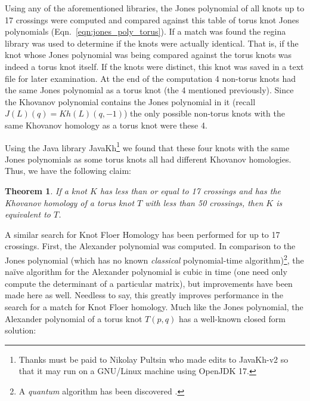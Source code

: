\documentclass{article}
\theoremstyle{plain}
\newtheorem{theorem}{Theorem}
\begin{document}
        Using any of the aforementioned libraries, the Jones polynomial of all
        knots up to 17 crossings were computed and compared against this table
        of torus knot Jones polynomials (Eqn.~\ref{eqn:jones_poly_torus}).
        If a match was found the regina library was used to determine if the
        knots were actually identical. That is, if the knot whose Jones
        polynomial was being compared against the torus knots was indeed a
        torus knot itself. If the knots were distinct, this knot was saved in a
        text file for later examination. At the end of the computation 4
        non-torus knots had the same Jones polynomial as a torus knot
        (the 4 mentioned previously).
        Since the Khovanov polynomial contains the Jones polynomial in it
        (recall $J(L)(q)=Kh(L)(q,-1)$) the only possible non-torus knots with
        the same Khovanov homology as a torus knot were these 4.
        \par\hfill\par
        Using the Java library JavaKh\footnote{%
            Thanks must be paid to Nikolay Pultsin who made edits to
            JavaKh-v2 so that it may run on a GNU/Linux machine using
            OpenJDK 17.
        }
        we found that these four knots with the same Jones polynomials as some
        torus knots all had different Khovanov homologies. Thus, we have the
        following claim:
        \begin{theorem}
            If a knot $K$ has less than or equal to 17 crossings and has the
            Khovanov homology of a torus knot $T$ with less than 50 crossings,
            then $K$ is equivalent to $T$.
        \end{theorem}
        A similar search for Knot Floer Homology has been performed for up to 17
        crossings. First, the Alexander polynomial was computed.
        In comparison to the Jones polynomial (which has no known
        \textit{classical} polynomial-time algorithm)\footnote{%
            A \textit{quantum} algorithm has been discovered
            \cite{JonesQuantumAlgorithm}.
        }, the na\"{i}ve algorithm for the Alexander polynomial is cubic in
        time (one need only compute the determinant of a particular matrix), but
        improvements have been made here as well. Needless to say, this greatly
        improves performance in the search for a match for Knot Floer homology.
        Much like the Jones polynomial, the Alexander polynomial of a torus
        knot $T(p,q)$ has a well-known closed form solution:
\end{document}
